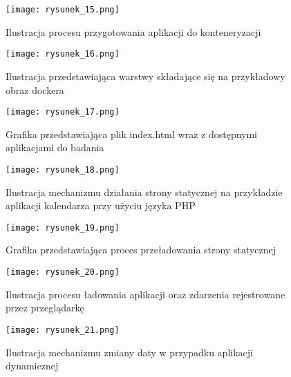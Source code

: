 \begin{figure}[!ht]
    \centering
    \texttt{[image: rysunek\_15.png]}
    \caption{Ilustracja procesu przygotowania aplikacji do konteneryzacji}
    \label{fig:rysunek_15}
\end{figure}

\begin{figure}[!ht]
    \centering
    \texttt{[image: rysunek\_16.png]}
    \caption{Ilustracja przedstawiająca warstwy składające się na  przykładowy obraz dockera}
    \label{fig:rysunek_16}
\end{figure}

\begin{figure}[!ht]
    \centering
    \texttt{[image: rysunek\_17.png]}
    \caption{Grafika przedstawiająca plik index.html wraz z dostępnymi aplikacjami do badania}
    \label{fig:rysunek_17}
\end{figure}

\begin{figure}[!ht]
    \centering
    \texttt{[image: rysunek\_18.png]}
    \caption{Ilustracja mechanizmu działania strony statycznej na przykładzie aplikacji kalendarza przy użyciu języka PHP}
    \label{fig:rysunek_18}
\end{figure}

\begin{figure}[!ht]
    \centering
    \texttt{[image: rysunek\_19.png]}
    \caption{Grafika przedstawiająca proces przeładowania strony statycznej}
    \label{fig:rysunek_19}
\end{figure}

\begin{figure}[!ht]
    \centering
    \texttt{[image: rysunek\_20.png]}
    \caption{Ilustracja procesu ładowania aplikacji oraz zdarzenia rejestrowane przez przeglądarkę}
    \label{fig:rysunek_20}
\end{figure}

\begin{figure}[!ht]
    \centering
    \texttt{[image: rysunek\_21.png]}
    \caption{Ilustracja mechanizmu zmiany daty w przypadku aplikacji dynamicznej}
    \label{fig:rysunek_21}
\end{figure}

\let\cleardoublepage\clearpage